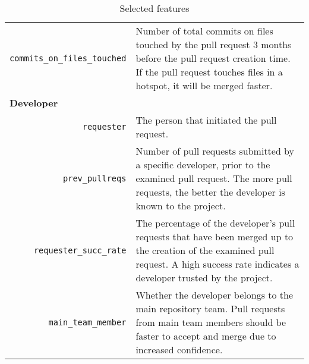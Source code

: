 \documentclass{sig-alternate}
\begin{document}
\begin{table*}
\begin{small}
\begin{tabular}{rp{40em}}
    \texttt{commits\_on\_files\_touched} & Number of total commits on files
    touched by the pull request 3 months before the pull request creation time.
    If the pull request touches files in a hotspot, it will be merged faster.\\
 
    \multicolumn{2}{l}{\bf{Developer}}\\
    
    \texttt{requester} & The person that initiated the pull request.\\

    \texttt{prev\_pullreqs} & Number of pull requests submitted by a specific
    developer, prior to the examined pull request. The more pull requests, the
    better the developer is known to the project.\\

    \texttt{requester\_succ\_rate} & The percentage of the developer's pull requests that have been merged up to the creation of the examined pull
    request. A high success rate indicates a developer trusted by the project.\\

    \texttt{main\_team\_member} & Whether the developer belongs to the
    main repository team. Pull requests from main team members should be
    faster to accept and merge due to increased confidence.\\
    \hline
  \end{tabular}
  \caption{Selected features}
  \label{tab:features}
  \end{small}
\end{table*}
\end{document}
